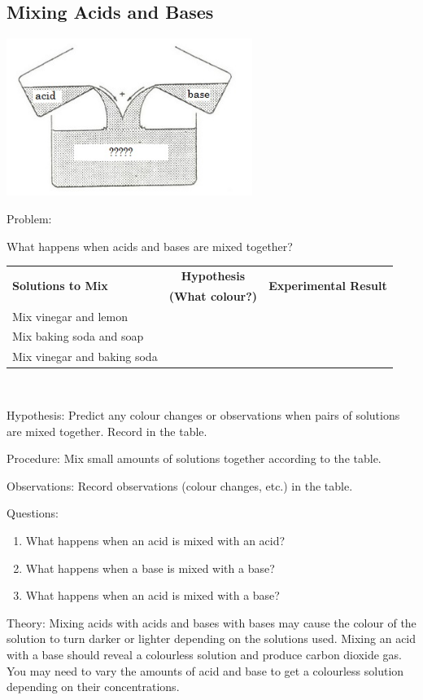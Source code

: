 \subsection{Mixing Acids and Bases}

\begin{center}
\includegraphics[width=0.6\textwidth]{./img/source/mixing-acid-base.jpg}
\end{center}

\begin{description*}
\item[Problem:]{What happens when acids and bases are mixed together?\\

\begin{tabular}{|l|c|c|} \hline
\multirow{2}{*}{\textbf{Solutions to Mix}} & \textbf{Hypothesis} & \multirow{2}{*}{\textbf{Experimental Result}} \\
& \textbf{(What colour?)} & \\ \hline
Mix vinegar and lemon & & \\ \hline
Mix baking soda and soap & & \\ \hline
Mix vinegar and baking soda & & \\ \hline
\end{tabular}\\[10pt]
}
\item[Hypothesis:]{Predict any colour changes or observations when pairs of solutions are mixed together. Record in the table.}
\item[Procedure:]{Mix small amounts of solutions together according to the table.}
\item[Observations:]{Record observations (colour changes, etc.) in the table.}
\item[Questions:]{\hfill
\begin{enumerate}
\item What happens when an acid is mixed with an acid?
\item What happens when a base is mixed with a base?
\item What happens when an acid is mixed with a base?
\end{enumerate}
}
\item[Theory:]{Mixing acids with acids and bases with bases may cause the colour of the solution to turn darker or lighter depending on the solutions used. Mixing an acid with a base should reveal a colourless solution and produce carbon dioxide gas. You may need to vary the amounts of acid and base to get a colourless solution depending on their concentrations.}
\end{description*}




\pagebreak